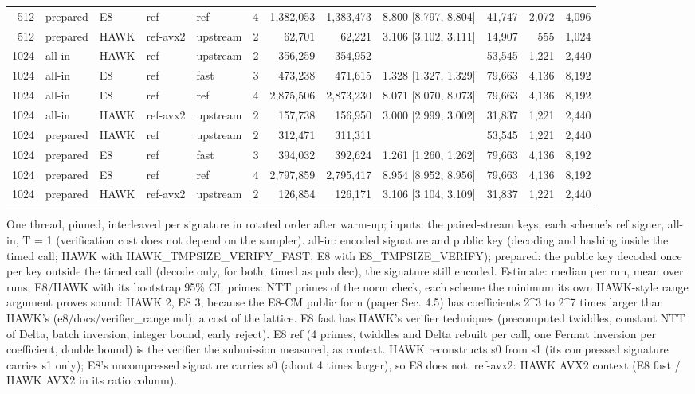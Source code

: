 \begin{table}[t]
{\begin{tabular}{rllllrrrlrrr}
512 & prepared & E8 & ref & ref & 4 & 1{,}382{,}053 & 1{,}383{,}473 & 8.800 [8.797, 8.804] & 41{,}747 & 2{,}072 & 4{,}096 \\
512 & prepared & HAWK & ref-avx2 & upstream & 2 & 62{,}701 & 62{,}221 & 3.106 [3.102, 3.111] & 14{,}907 & 555 & 1{,}024 \\
1024 & all-in & HAWK & ref & upstream & 2 & 356{,}259 & 354{,}952 &  & 53{,}545 & 1{,}221 & 2{,}440 \\
1024 & all-in & E8 & ref & fast & 3 & 473{,}238 & 471{,}615 & 1.328 [1.327, 1.329] & 79{,}663 & 4{,}136 & 8{,}192 \\
1024 & all-in & E8 & ref & ref & 4 & 2{,}875{,}506 & 2{,}873{,}230 & 8.071 [8.070, 8.073] & 79{,}663 & 4{,}136 & 8{,}192 \\
1024 & all-in & HAWK & ref-avx2 & upstream & 2 & 157{,}738 & 156{,}950 & 3.000 [2.999, 3.002] & 31{,}837 & 1{,}221 & 2{,}440 \\
1024 & prepared & HAWK & ref & upstream & 2 & 312{,}471 & 311{,}311 &  & 53{,}545 & 1{,}221 & 2{,}440 \\
1024 & prepared & E8 & ref & fast & 3 & 394{,}032 & 392{,}624 & 1.261 [1.260, 1.262] & 79{,}663 & 4{,}136 & 8{,}192 \\
1024 & prepared & E8 & ref & ref & 4 & 2{,}797{,}859 & 2{,}795{,}417 & 8.954 [8.952, 8.956] & 79{,}663 & 4{,}136 & 8{,}192 \\
1024 & prepared & HAWK & ref-avx2 & upstream & 2 & 126{,}854 & 126{,}171 & 3.106 [3.104, 3.109] & 31{,}837 & 1{,}221 & 2{,}440 \\
\bottomrule
\end{tabular}}
\par\smallskip\parbox{\linewidth}{\scriptsize One thread, pinned, interleaved per signature in rotated order after warm-up; inputs: the paired-stream keys, each scheme's ref signer, all-in, T = 1 (verification cost does not depend on the sampler). all-in: encoded signature and public key (decoding and hashing inside the timed call; HAWK with HAWK\_TMPSIZE\_VERIFY\_FAST, E8 with E8\_TMPSIZE\_VERIFY); prepared: the public key decoded once per key outside the timed call (decode only, for both; timed as pub dec), the signature still encoded. Estimate: median per run, mean over runs; E8/HAWK with its bootstrap 95\% CI. primes: NTT primes of the norm check, each scheme the minimum its own HAWK-style range argument proves sound: HAWK 2, E8 3, because the E8-CM public form (paper Sec. 4.5) has coefficients 2^3 to 2^7 times larger than HAWK's (e8/docs/verifier\_range.md); a cost of the lattice. E8 fast has HAWK's verifier techniques (precomputed twiddles, constant NTT of Delta, batch inversion, integer bound, early reject). E8 ref (4 primes, twiddles and Delta rebuilt per call, one Fermat inversion per coefficient, double bound) is the verifier the submission measured, as context. HAWK reconstructs s0 from s1 (its compressed signature carries s1 only); E8's uncompressed signature carries s0 (about 4 times larger), so E8 does not. ref-avx2: HAWK AVX2 context (E8 fast / HAWK AVX2 in its ratio column).}
\end{table}

